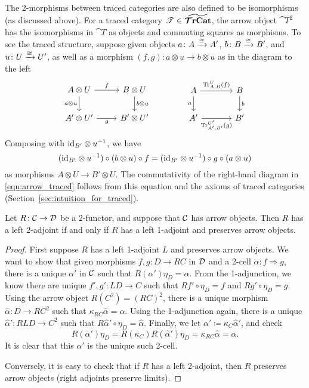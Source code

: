 \documentclass[11pt,oneside,article]{memoir}
\begin{document}
\begin{example}
The 2-morphisms between traced categories are also defined to be isomorphisms (as discussed above). For a traced category $\mathscr{T}\in\widetilde{\bm{\mathcal{T}}\mathbf{rCat}}$, the arrow object $\cat{T}^2$ has the isomorphisms in $\cat{T}$ as objects and commuting squares as morphisms. To see the traced structure, suppose given objects $a\colon A\xrightarrow{\cong} A'$, $b\colon B\xrightarrow{\cong} B'$, and $u\colon U\xrightarrow{\cong} U'$, as well as a morphism $(f,g)\colon a\otimes u\to b\otimes u$ as in the diagram to the left
\begin{equation}\label{eqn:arrow_traced}
\begin{tikzcd}
	A\otimes U\ar[d,"a\otimes u"']\ar[r,"f"]&B\otimes U\ar[d,"b\otimes u"]\\
	A'\otimes U'\ar[r,"g"']&B'\otimes U'
\end{tikzcd}
\qquad\qquad
\begin{tikzcd}[column sep=large]
	A\ar[d,"a"']\ar[r,"\Tr^U_{A,B}(f)"]&B\ar[d,"b"]\\
	A'\ar[r,"\Tr^{U'}_{A',B'}(g)"']&B'
\end{tikzcd}
\end{equation}
Composing with $\mathrm{id}_{B'}\otimes u^{-1}$, we have
$$
(\mathrm{id}_{B'}\otimes u^{-1})\circ(b\otimes u)\circ f=(\mathrm{id}_{B'}\otimes u^{-1})\circ g\circ(a\otimes u)
$$
as morphisms $A\otimes U\to B'\otimes U$. The commutativity of the right-hand diagram in \eqref{eqn:arrow_traced} follows from this equation and the axioms of traced categories (Section~\ref{sec:intuition_for_traced}).
\end{example}

\begin{lemma}
   Let $R\colon\mathcal{C}\to\mathcal{D}$ be a 2-functor, and suppose that $\mathcal{C}$ has arrow objects.
   Then $R$ has a left 2-adjoint if and only if $R$ has a left 1-adjoint and preserves arrow
   objects.
\end{lemma}
\begin{proof}
   First suppose $R$ has a left 1-adjoint $L$ and preserves arrow objects. We want to show that
   given morphisms $f,g\colon D\to RC$ in $\mathcal{D}$ and a 2-cell $\alpha\colon f\Rightarrow g$,
   there is a unique $\alpha'$ in $\mathcal{C}$ such that $R(\alpha')\eta_D=\alpha$. From the
   1-adjunction, we know there are unique $f',g'\colon LD\to C$ such that $Rf'\circ\eta_D=f$ and
   $Rg'\circ\eta_D=g$. Using the arrow object $R(C^2)=(RC)^2$, there is a unique morphism
   $\hat{\alpha}\colon D\to RC^2$ such that $\kappa_{RC}\hat{\alpha}=\alpha$. Using the 1-adjunction
   again, there is a unique $\hat{\alpha}'\colon RLD\to C^2$ such that
   $R\hat{\alpha}'\circ\eta_D=\hat{\alpha}$. Finally, we let
   $\alpha'\coloneqq\kappa_C\hat{\alpha}'$, and check
   \begin{equation*}
      R(\alpha')\eta_D = R(\kappa_C)R(\hat{\alpha}')\eta_D
         = \kappa_{RC}\hat{\alpha} = \alpha.
   \end{equation*}
   It is clear that this $\alpha'$ is the unique such 2-cell.

   Conversely, it is easy to check that if $R$ has a left 2-adjoint, then $R$ preserves arrow
   objects (right adjoints preserve limits).
\end{proof}
\end{document}
